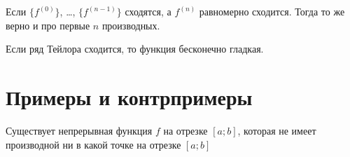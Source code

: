 \documentclass[12pt,a4paper]{article}
\begin{document}
    \begin{corollary}
        Если $\{f^{(0)}\}$, \dots, $\{f^{(n-1)}\}$ сходятся, а $f^{(n)}$ равномерно сходится. Тогда то же верно и про первые $n$ производных.
    \end{corollary}

    \begin{corollary}
        Если ряд Тейлора сходится, то функция бесконечно гладкая.
    \end{corollary}

    \section{Примеры и контрпримеры}

    \begin{theorem}
        Существует непрерывная функция $f$ на отрезке $[a; b]$, которая не имеет производной ни в какой точке на отрезке $[a; b]$
    \end{theorem}
\end{document}
